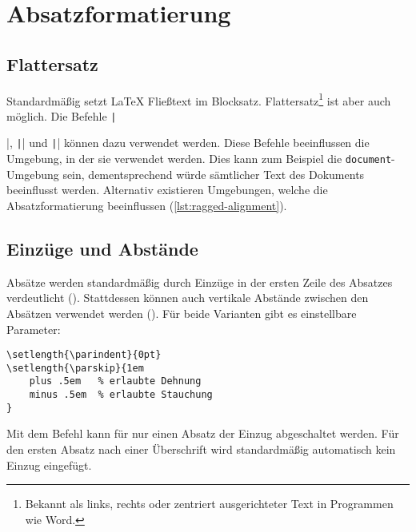 \section{Absatzformatierung} %
\label{sec:formatting-paragraphs}

\subsection*{Flattersatz}
\label{sub:ragged-alignment}
Standardmäßig setzt \LaTeX{} Fließtext im Blocksatz. 
Flattersatz\footnote{Bekannt als links, rechts oder zentriert ausgerichteter Text in Programmen wie Word.} ist aber auch möglich. 
Die Befehle \texttt|\raggedright|, \texttt|\raggedleft| und \texttt|\centering| können dazu verwendet werden. 
Diese Befehle beeinflussen die Umgebung, in der sie verwendet werden. 
Dies kann zum Beispiel die \texttt{document}-Umgebung sein, dementsprechend würde sämtlicher Text des Dokuments beeinflusst werden.
Alternativ existieren Umgebungen, welche die Absatzformatierung beeinflussen (\cref{lst:ragged-alignment}).


\subsection*{Einzüge und Abstände}
\label{sub:indents-and-parskips}
Absätze werden standardmäßig durch Einzüge in der ersten Zeile des Absatzes verdeutlicht (\texttt{\parindent}). 
Stattdessen können auch vertikale Abstände zwischen den Absätzen verwendet werden (\texttt{\parskip}). 
Für beide Varianten gibt es einstellbare Parameter:
\begin{verbatim}
\setlength{\parindent}{0pt}
\setlength{\parskip}{1em
    plus .5em   % erlaubte Dehnung
    minus .5em  % erlaubte Stauchung
}
\end{verbatim}
Mit dem Befehl \texttt{\noindent} kann für nur einen Absatz der Einzug abgeschaltet werden. 
Für den ersten Absatz nach einer Überschrift wird standardmäßig automatisch kein Einzug eingefügt.

